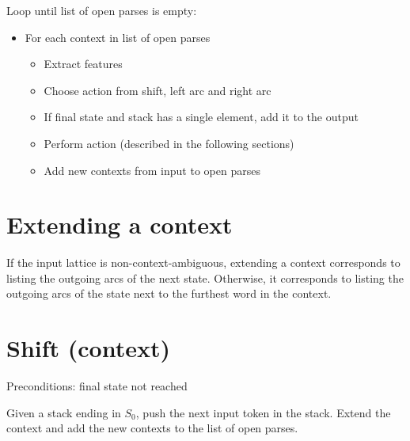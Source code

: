 \documentclass{article}
\begin{document}
Loop until list of open parses is empty:
\begin{itemize}
\item For each context in list of open parses
    \begin{itemize}
    \item Extract features
    \item Choose action from shift, left arc and right arc
    \item If final state and stack has a single element, add it to the output
    \item Perform action (described in the following sections)
    \item Add new contexts from input to open parses
    \end{itemize}
\end{itemize}

\section{Extending a context}

If the input lattice is non-context-ambiguous, extending a context corresponds to listing the outgoing arcs of the next state.
Otherwise, it corresponds to listing the outgoing arcs of the state next to the furthest word in the context.

\section{Shift (context)}

Preconditions: final state not reached

Given a stack ending in $S_0$, push the next input token in the stack. Extend the context and add the new contexts to the list of open parses.

\end{document}
